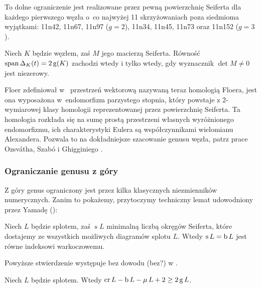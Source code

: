 To dolne ograniczenie jest realizowane przez pewną powierzchnię Seiferta dla każdego pierwszego węzła o~co najwyżej 11 skrzyżowaniach poza siedmioma wyjątkami: 11n42, 11n67, 11n97 ($g = 2$), 11n34, 11n45, 11n73 oraz 11n152 ($g = 3$).

\begin{proposition}
    Niech $K$ będzie węzłem, zaś $M$ jego macierzą Seiferta.
    Równość $\operatorname{span} \Delta_K(t) = 2\operatorname{g}(K)$ zachodzi wtedy i tylko wtedy, gdy wyznacznik $\det M \neq 0$ jest niezerowy.
\end{proposition}

Floer zdefiniował w~\cite{floer90} przestrzeń wektorową nazywaną teraz homologią Floera, jest ona wyposażona w~endomorfizm parzystego stopnia, który powstaje z 2-wymiarowej klasy homologii reprezentowanej przez powierzchnię Seiferta.
Ta homologia rozkłada się na sumę prostą przestrzeni własnych wyróżnionego endomorfizmu, ich charakterystyki Eulera są współczynnikami wielomianu Alexandera.
Pozwala to na dokładniejsze szacowanie genusu węzła, patrz prace Ozsvátha, Szabó \cite{szabo03} i Ghigginiego \cite{ghiggini08}.


\subsubsection{Ograniczanie genusu z góry}
Z góry genus ograniczony jest przez kilka klasycznych niezmienników numerycznych.
Zanim to pokażemy, przytoczymy techniczny lemat udowodniony przez Yamadę (\cite{yamada87}):

\begin{proposition}
    \label{prp:seifert_circles_braid}
    Niech $L$ będzie splotem, zaś $\operatorname{s} L$ minimalną liczbą okręgów Seiferta, które dostajemy ze wszystkich możliwych diagramów splotu $L$.
    Wtedy $\operatorname{s} L = \operatorname{b} L$ jest równe indeksowi warkoczowemu.
%
\end{proposition}

Powyższe stwierdzenie występuje bez dowodu (bez?) w \cite[s. 17]{kawauchi96}.

\begin{proposition}
    Niech $L$ będzie splotem.
    Wtedy $\operatorname{cr} L - \operatorname{b} L - \operatorname{\mu} L + 2 \ge 2 \operatorname{g} L$.
\end{proposition}

